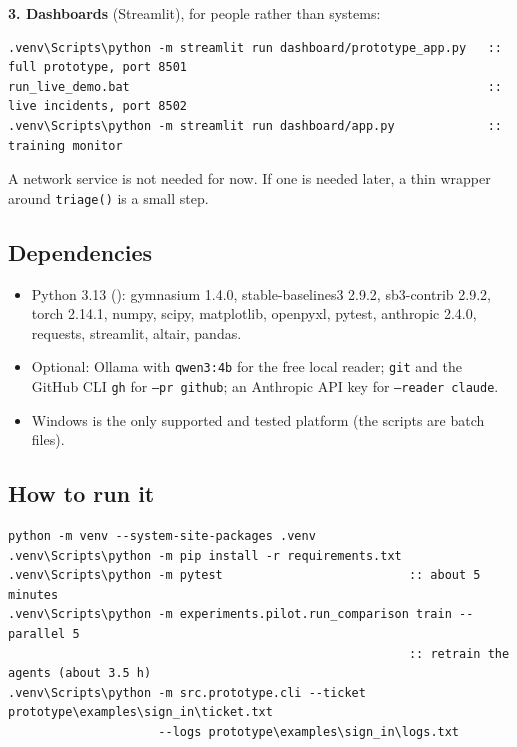 \documentclass[11pt,a4paper]{article}
\newcommand{\code}[1]{\path{#1}}
\newenvironment{codeblock}{\par\footnotesize}{\par}
\begin{document}
\textbf{3. Dashboards} (Streamlit), for people rather than systems:

\begin{codeblock}
\begin{verbatim}
.venv\Scripts\python -m streamlit run dashboard/prototype_app.py   :: full prototype, port 8501
run_live_demo.bat                                                  :: live incidents, port 8502
.venv\Scripts\python -m streamlit run dashboard/app.py             :: training monitor
\end{verbatim}
\end{codeblock}

A network service is not needed for now. If one is needed later, a thin wrapper around
\texttt{triage()} is a small step.

\subsection{Dependencies}

\begin{itemize}
\item Python 3.13 (\code{requirements.txt}): gymnasium 1.4.0, stable-baselines3 2.9.2,
  sb3-contrib 2.9.2, torch 2.14.1, numpy, scipy, matplotlib, openpyxl, pytest, anthropic 2.4.0,
  requests, streamlit, altair, pandas.
\item Optional: Ollama with \texttt{qwen3:4b} for the free local reader; \texttt{git} and the
  GitHub CLI \texttt{gh} for \texttt{--pr github}; an Anthropic API key for
  \texttt{--reader claude}.
\item Windows is the only supported and tested platform (the scripts are batch files).
\end{itemize}

\subsection{How to run it}

\begin{codeblock}
\begin{verbatim}
python -m venv --system-site-packages .venv
.venv\Scripts\python -m pip install -r requirements.txt
.venv\Scripts\python -m pytest                          :: about 5 minutes
.venv\Scripts\python -m experiments.pilot.run_comparison train --parallel 5
                                                        :: retrain the agents (about 3.5 h)
.venv\Scripts\python -m src.prototype.cli --ticket prototype\examples\sign_in\ticket.txt
                     --logs prototype\examples\sign_in\logs.txt
\end{verbatim}
\end{codeblock}
\end{document}
